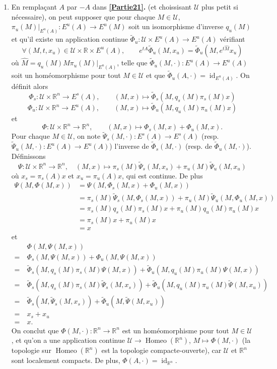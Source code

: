 \documentclass[french]{article}
\theoremstyle{definition}
\newcommand{\wh}[1]{\widehat{#1}}
\newcommand{\wt}[1]{\widetilde{#1}}
\newcommand{\Rbb}{\mathbb{R}}
\newcommand{\Ucal}{\mathcal{U}}
\newcommand{\id}{\operatorname{id}}
\newcommand{\Homeo}{\operatorname{Homeo}}
\begin{document}
\begin{enumerate}
    \item \label{Partie22} En rempla\c cant $A$ par $-A$ dans {\bf \ref{Partie21}.} (et choissisant $\Ucal$ plus petit si n\'ecessaire), on peut supposer que pour chaque $M \in \Ucal$, $\pi_u(M)|_{E^u(A)}:E^u(A) \to E^u(M)$ soit un isomorphisme d'inverse $q_u(M)$ et qu'il existe un application continue $\wt{\Phi}_u : \Ucal \times E^u(A) \to E^u(A)$ v\'erifiant
        $$\forall (M,t,x_u) \in \Ucal \times \Rbb \times E^u(A), \qquad e^{tA} \wt{\Phi}_u(M,x_u) = \wt{\Phi}_u(M, e^{t\wh{M}}x_u)$$
    o\`u $\wh{M} = q_u(M)M\pi_u(M)|_{E^u(A)}$, telle que $\wt{\Phi}_u(M,\cdot):E^u(A) \to E^u(A)$ soit un hom\'eomorphisme pour tout $M \in \Ucal$ et que $\wt{\Phi}_u(A,\cdot) = \id_{E^u(A)}$. On d\'efinit alors
        $$\Phi_s: \Ucal \times \Rbb^n \to E^s(A), \qquad (M,x) \mapsto \wt{\Phi}_s(M,q_s(M)\pi_s(M)x)$$
        $$\Phi_u: \Ucal \times \Rbb^n \to E^u(A), \qquad (M,x) \mapsto \wt{\Phi}_u(M,q_u(M)\pi_u(M)x)$$
    et
        $$\Phi: \Ucal \times \Rbb^n \to \Rbb^n, \qquad (M,x) \mapsto \Phi_s(M,x) + \Phi_u(M,x).$$
    Pour chaque $M \in \Ucal$, on note $\wt{\Psi}_s(M, \cdot): E^s(A) \to E^s(A)$ (resp. $\wt{\Psi}_u(M, \cdot): E^u(A) \to E^u(A)$) l'inverse de $\wt{\Phi}_s(M,\cdot)$ (resp. de $\wt{\Phi}_u(M, \cdot)$). D\'efinissons
        $$\Psi: \Ucal \times \Rbb^n \to \Rbb^n, \quad (M,x) \mapsto \pi_s(M) \wt{\Psi}_s(M, x_s) + \pi_u(M) \wt{\Psi}_u(M, x_u)$$
    o\`u $x_s = \pi_s(A)x$ et $x_u = \pi_u(A)x$, qui est continue. De plus
        \begin{align*}
            \Psi(M,\Phi(M,x)) & = \Psi(M,\Phi_s(M,x) +\Phi_u(M,x))\\
            & = \pi_s(M)\wt{\Psi}_s(M, \Phi_s(M,x)) + \pi_u(M)\wt{\Psi}_u(M, \Phi_u(M,x))\\
            & = \pi_s(M) q_s(M) \pi_s(M)x + \pi_u(M) q_u(M) \pi_u(M)x\\
            & = \pi_s(M)x + \pi_u(M)x \\
            & = x
        \end{align*}
    et
        \begin{align*}
             & \Phi(M,\Psi(M,x))\\
            =\ & \Phi_s(M,\Psi(M,x)) + \Phi_u(M,\Psi(M,x))\\
            =\ & \wt{\Phi}_s(M,q_s(M)\pi_s(M)\Psi(M,x)) + \wt{\Phi}_u(M,q_u(M)\pi_u(M)\Psi(M,x)) \\
            =\ & \wt{\Phi}_s(M,q_s(M)\pi_s(M)\wt{\Psi}_s(M,x_s)) + \wt{\Phi}_u(M,q_u(M)\pi_u(M)\wt{\Psi}(M,x_u))\\
            =\ & \wt{\Phi}_s(M,\wt{\Psi}_s(M,x_s)) + \wt{\Phi}_u(M,\wt{\Psi}(M,x_u)) \\
            =\ & x_s + x_u \\
            =\ & x.
        \end{align*}
    On conclut que $\Phi(M,\cdot): \Rbb^n \to \Rbb^n$ est un hom\'eomorphisme pour tout $M \in \Ucal$, et qu'on a une application continue $\Ucal \to \Homeo(\Rbb^n)$, $M \mapsto \Phi(M,\cdot)$ (la topologie sur $\Homeo(\Rbb^n)$ est la topologie compacte-ouverte), car $\Ucal$ et $\Rbb^n$ sont localement compacts. De plus, $\Phi(A,\cdot) = \id_{\Rbb^n}$. 
    

\end{enumerate}
\end{document}
